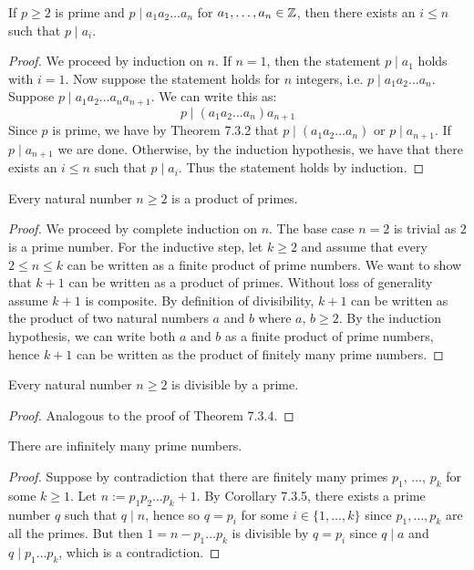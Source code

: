 \begin{corrbox}
   If $p \geq 2$ is prime and $p \mid a_1a_2\dots a_n$ for $a_1, \dots, a_n \in \mathbb{Z}$, then there exists an $i \leq n$ such that $p \mid a_i$.
\end{corrbox}
\begin{proof}
   We proceed by induction on $n$. If $n = 1$, then the statement $p \mid a_1$ holds with $i = 1$. Now suppose the statement holds for $n$ integers, i.e. $p \mid a_1a_2\dots a_n$. Suppose $p \mid a_1a_2\dots a_na_{n+1}$. We can write this as:
   \[  p \mid (a_1a_2\dots a_n)a_{n+1} \]
   Since $p$ is prime, we have by Theorem 7.3.2 that $p \mid (a_1a_2 \dots a_n)$ or $p \mid a_{n+1}$. If $p \mid a_{n+1}$ we are done. Otherwise, by the induction hypothesis, we have that there exists an $i \leq n$ such that $p \mid a_i$. Thus the statement holds by induction. 
\end{proof}

\begin{thmbox}
   Every natural number $n \geq 2$ is a product of primes.
\end{thmbox}
\begin{proof}
   We proceed by complete induction on $n$. The base case $n = 2$ is trivial as $2$ is a prime number.  For the inductive step, let $k \geq 2$ and assume that every $2 \leq n \leq k$ can be written as a finite product of prime numbers. We want to show that $k + 1$ can be written as a product of primes. Without loss of generality assume $k + 1$ is composite. By definition of divisibility, $k + 1$ can be written as the product of two natural numbers $a$ and $b$ where $a$, $b \geq 2$. By the induction hypothesis, we can write both $a$ and $b$ as a finite product of prime numbers, hence $k + 1$ can be written as the product of finitely many prime numbers.   
\end{proof}

\begin{corrbox}
   Every natural number $n \geq 2$ is divisible by a prime.
\end{corrbox}
\begin{proof}
   Analogous to the proof of Theorem 7.3.4. 
\end{proof}

\begin{corrbox}
   There are infinitely many prime numbers.
\end{corrbox}
\begin{proof}
   Suppose by contradiction that there are finitely many primes $p_1$, $\dots$, $p_k$ for some $k \geq 1$. Let $n := p_1p_2\dots p_k + 1$. By Corollary 7.3.5, there exists a prime number $q$ such that $q \mid n$, hence so $q = p_i$ for some $i \in \{1, \dots, k\}$ since $p_1, \dots, p_k$ are all the primes. But then $1 = n - p_1\dots p_k$ is divisible by $q = p_i$ since $q \mid a$ and $q \mid p_1 \dots p_k$, which is a contradiction.
\end{proof}

